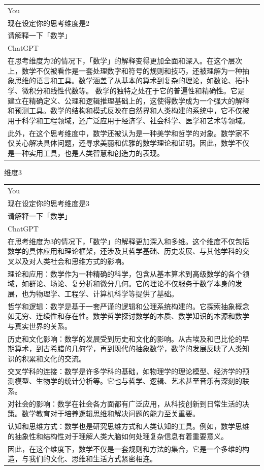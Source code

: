 \documentclass[12pt]{book}
\begin{document}
\begin{tabular}{|p{15cm}|p{3cm}|}
	\hline
You\\
现在设定你的思考维度是2\\

请解释一下「数学」\\
ChatGPT\\
在思考维度为2的情况下，「数学」的解释变得更加全面和深入。在这个层次上，数学不仅被看作是一套处理数字和符号的规则和技巧，还被理解为一种抽象思维的语言和工具。数学涵盖了从基本的算术到复杂的理论，如数论、拓扑学、微积分和线性代数等。
数学的独特之处在于它的普遍性和精确性。它是建立在精确定义、公理和逻辑推理基础上的，这使得数学成为一个强大的解释和预测工具。数学的结构和模式反映在自然界和人类构建的系统中，它不仅被用于科学和工程领域，还广泛应用于经济学、社会科学、医学和艺术等领域。\\
此外，在这个思考维度中，数学还被认为是一种美学和哲学的对象。数学家不仅关心解决具体问题，还寻求美丽和优雅的数学理论和证明。因此，数学不仅是一种实用工具，也是人类智慧和创造力的表现。\\
	\hline
\end{tabular}


\bigskip
维度3

\begin{tabular}{|p{15cm}|p{3cm}|}
	\hline
You\\
现在设定你的思考维度是3\\

请解释一下「数学」\\
ChatGPT\\
在思考维度为3的情况下，「数学」的解释更加深入和多维。这个维度不仅包括数学的具体应用和理论框架，还涉及其哲学基础、历史发展、与其他学科的交叉以及对人类社会和思维方式的影响。\\
理论和应用：数学作为一种精确的科学，包含从基本算术到高级数学的各个领域，如群论、场论、复分析和微分几何。它的理论不仅服务于数学本身的发展，也为物理学、工程学、计算机科学等提供了基础。\\
哲学和逻辑：数学是基于一套严谨的逻辑和公理系统构建的。它探索抽象概念如无穷、连续性和存在性。数学哲学探讨数学的本质、数学知识的本源和数学与真实世界的关系。\\
历史和文化影响：数学的发展受到历史和文化的影响。从古埃及和巴比伦的早期算术，到古希腊的几何学，再到现代的抽象数学，数学的发展反映了人类知识的积累和文化的交流。\\
交叉学科的连接：数学是许多学科的基础，如物理学的理论模型、经济学的预测模型、生物学的统计分析等。它也与哲学、逻辑、艺术甚至音乐有深刻的联系。\\
对社会的影响：数学在社会各方面都有广泛应用，从科技创新到日常生活的决策。数学教育对于培养逻辑思维和解决问题的能力至关重要。\\
认知和思维方式：数学也是研究思维方式和人类认知的工具。例如，数学思维的抽象性和结构性对于理解人类大脑如何处理复杂信息有着重要意义。\\
因此，在这个维度下，数学不仅是一套规则和方法的集合，它是一个多维的构造，与我们的文化、思维和生活方式紧密相连。\\

	\hline
\end{tabular}
\end{document}
